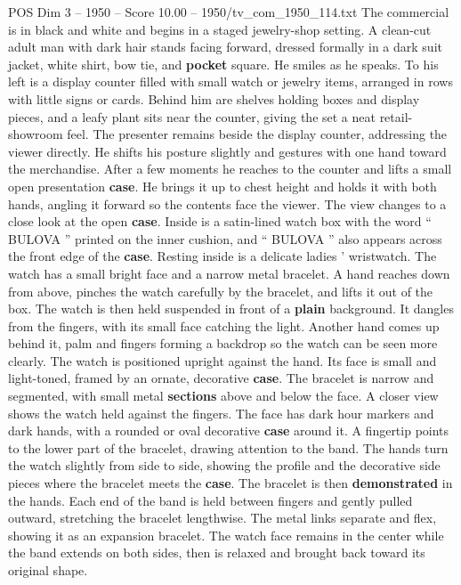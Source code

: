 \begin{textsample}{POS Dim 3 – 1950 – Score 10.00 – 1950/tv\_com\_1950\_114.txt}  \label{ex:f3_pos_020}
The commercial is in black and white and begins in a staged jewelry-shop setting.
A clean-cut adult man with dark hair stands facing forward, dressed formally in a dark suit jacket, white shirt, bow tie, and \textbf{pocket} square.
He smiles as he speaks.
To his left is a display counter filled with small watch or jewelry items, arranged in rows with little signs or cards.
Behind him are shelves holding boxes and display pieces, and a leafy plant sits near the counter, giving the set a neat retail-showroom feel.
The presenter remains beside the display counter, addressing the viewer directly.
He shifts his posture slightly and gestures with one hand toward the merchandise.
After a few moments he reaches to the counter and lifts a small open presentation \textbf{case}.
He brings it up to chest height and holds it with both hands, angling it forward so the contents face the viewer.
The view changes to a close look at the open \textbf{case}.
Inside is a satin-lined watch box with the word “ BULOVA ” printed on the inner cushion, and “ BULOVA ” also appears across the front edge of the \textbf{case}.
Resting inside is a delicate ladies ’ wristwatch.
The watch has a small bright face and a narrow metal bracelet.
A hand reaches down from above, pinches the watch carefully by the bracelet, and lifts it out of the box.
The watch is then held suspended in front of a \textbf{plain} background.
It dangles from the fingers, with its small face catching the light.
Another hand comes up behind it, palm and fingers forming a backdrop so the watch can be seen more clearly.
The watch is positioned upright against the hand.
Its face is small and light-toned, framed by an ornate, decorative \textbf{case}.
The bracelet is narrow and segmented, with small metal \textbf{sections} above and below the face.
A closer view shows the watch held against the fingers.
The face has dark hour markers and dark hands, with a rounded or oval decorative \textbf{case} around it.
A fingertip points to the lower part of the bracelet, drawing attention to the band.
The hands turn the watch slightly from side to side, showing the profile and the decorative side pieces where the bracelet meets the \textbf{case}.
The bracelet is then \textbf{demonstrated} in the hands.
Each end of the band is held between fingers and gently pulled outward, stretching the bracelet lengthwise.
The metal links separate and flex, showing it as an expansion bracelet.
The watch face remains in the center while the band extends on both sides, then is relaxed and brought back toward its original shape.

\end{textsample}
